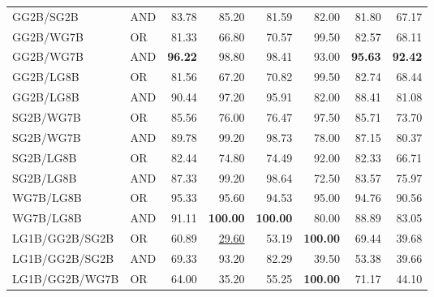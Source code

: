 \documentclass{article}
\begin{document}
{\begin{longtable}{llrrrrrr}
 GG2B/SG2B                & AND     & 83.78             & 85.20             & 81.59             & 82.00             & 81.80             & 67.17            \\
 GG2B/WG7B                & OR      & 81.33             & 66.80             & 70.57             & 99.50             & 82.57             & 68.11            \\
 GG2B/WG7B                & AND     & \textbf{96.22}    & 98.80             & 98.41             & 93.00             & \textbf{95.63}    & \textbf{92.42}   \\
 GG2B/LG8B                & OR      & 81.56             & 67.20             & 70.82             & 99.50             & 82.74             & 68.44            \\
 GG2B/LG8B                & AND     & 90.44             & 97.20             & 95.91             & 82.00             & 88.41             & 81.08            \\
 SG2B/WG7B                & OR      & 85.56             & 76.00             & 76.47             & 97.50             & 85.71             & 73.70            \\
 SG2B/WG7B                & AND     & 89.78             & 99.20             & 98.73             & 78.00             & 87.15             & 80.37            \\
 SG2B/LG8B                & OR      & 82.44             & 74.80             & 74.49             & 92.00             & 82.33             & 66.71            \\
 SG2B/LG8B                & AND     & 87.33             & 99.20             & 98.64             & 72.50             & 83.57             & 75.97            \\
 WG7B/LG8B                & OR      & 95.33             & 95.60             & 94.53             & 95.00             & 94.76             & 90.56            \\
 WG7B/LG8B                & AND     & 91.11             & \textbf{100.00}   & \textbf{100.00}   & 80.00             & 88.89             & 83.05            \\
 LG1B/GG2B/SG2B           & OR      & 60.89             & \underline{29.60} & 53.19             & \textbf{100.00}   & 69.44             & 39.68            \\
 LG1B/GG2B/SG2B           & AND     & 69.33             & 93.20             & 82.29             & 39.50             & 53.38             & 39.66            \\
 LG1B/GG2B/WG7B           & OR      & 64.00             & 35.20             & 55.25             & \textbf{100.00}   & 71.17             & 44.10            \\

\end{longtable}}
\end{document}
